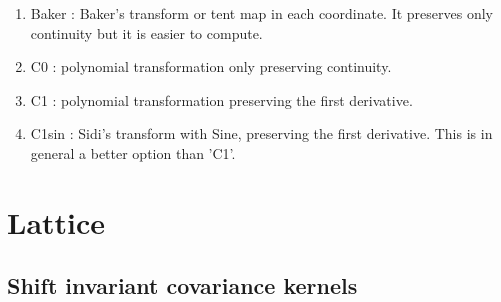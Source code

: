 \documentclass[handout, 10pt,compress,xcolor={usenames,dvipsnames}]{beamer} %
\begin{document}
\begin{enumerate}
\item Baker : Baker's transform or tent map in each coordinate. It preserves only continuity but it is easier to compute.
\item C0 : polynomial transformation only preserving continuity.
\item C1 : polynomial transformation preserving the first derivative.
\item C1sin : Sidi's transform with Sine, preserving the first derivative. This is in general a better option than 'C1'.
\end{enumerate}
\fi

































\section{Lattice}


\subsection{Shift invariant covariance kernels}
\end{document}
